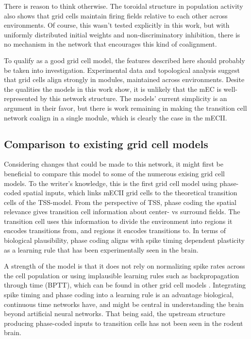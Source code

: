 \documentclass{article}
\begin{document}
    There is reason to think otherwise. The toroidal structure in population activity also shows that grid cells maintain firing fields relative to each other across environments. Of course, this wasn't tested explicitly in this work, but with uniformly distributed initial weights and non-discriminatory inhibition, there is no mechanism in the network that encourages this kind of coalignment.

    To qualify as a good grid cell model, the features described here should probably be taken into investigation. Experimental data and topological analysis suggest that grid cells align strongly in modules, maintained across environments. Desite the qualities the models in this work show, it is unlikely that the mEC is well-represented by this network structure. The models' current simplicity is an argument in their favor, but there is work remaining in making the transition cell network coalign in a single module, which is clearly the case in the mECII.

    \subsection{Comparison to existing grid cell models} \label{Other model comparisons}

    Considering changes that could be made to this network, it might first be beneficial to compare this model to some of the numerous exising grid cell models. To the writer's knowledge, this is the first grid cell model using phase-coded spatial inputs, which links mECII grid cells to the theoretical transition cells of the TSS-model. From the perspective of TSS, phase coding the spatial relevance gives transition cell information about center- vs surround fields. The transition cell uses this information to divide the environment into regions it encodes transitions from, and regions it encodes transitions to. In terms of biological plausibility, phase coding aligns with spike timing dependent plasticity as a learning rule that has been experimentally seen in the brain. 
    
    A strength of the model is that it does not rely on normalizing spike rates across the cell population or using implausible learning rules such as backpropagation through time (BPTT), which can be found in other grid cell models \parencite{Kropff2008,Sorscher2023}. Integrating spike timing and phase coding into a learning rule is an advantage biological, continuous time networks have, and might be central in understanding the brain beyond artificial neural networks. That being said, the upstream structure producing phase-coded inputs to transition cells has not been seen in the rodent brain.
\end{document}
